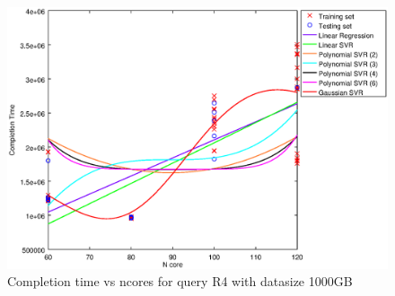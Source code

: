 
\begin {figure}[hbtp]
\centering
\includegraphics[width=\textwidth]{output/R4_1000_ONLY_1_LINEAR_NCORE/plot_R4_1000.eps}
\caption{Completion time vs ncores for query R4 with datasize 1000GB}
\label{fig:only_1_linear_R4_1000}
\end {figure}
